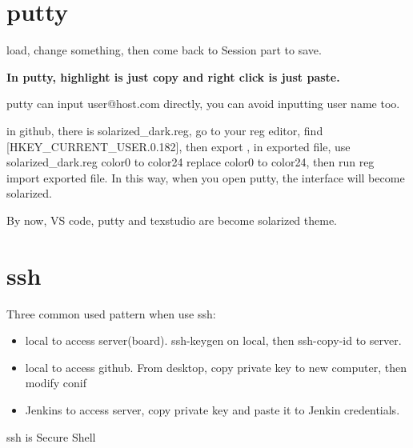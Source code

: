 \documentclass[a4paper,11pt,twoside]{book}
\begin{document}
\section{putty}

  load, change something, then come back to Session part to save. 
  
  
 \textbf{In putty, highlight is just copy and right click is just paste. } 
 
  putty can input user@host.com directly, you can avoid inputting user name too. 
  
  in github, there is solarized\_dark.reg, go to your reg editor, find [HKEY\_CURRENT\_USER\Software\SimonTatham\PuTTY\Sessions{}.0.182], then export , 
  in exported file, use solarized\_dark.reg color0 to color24 replace color0 to color24, then run 
  reg import exported file. In this way, when you open putty, the interface will become solarized.
 
  By now, VS code, putty and texstudio are become solarized theme. 

\section{ssh}
Three common used pattern when use ssh:
\begin{itemize}
	\item local to access server(board). ssh-keygen on local, then ssh-copy-id to server.
	
	\item local to access github. From desktop, copy private key to new computer, then modify conif
	
	\item Jenkins to access server, copy private key and paste it to Jenkin credentials. 
\end{itemize}


	ssh is Secure Shell
	
\end{document}
